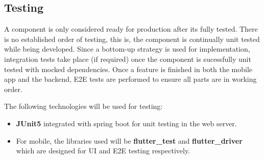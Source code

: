\subsection{Testing}
A component is only considered ready for production after its fully tested. 
There is no established order of testing, this is, the component is continually unit tested while being developed.
Since a bottom-up strategy is used for implementation, integration tests take place (if required) once the component is sucessfully unit tested with mocked dependencies.
Once a feature is finished in both the mobile app and the backend, E2E tests are performed to ensure all parts are in working order.

The following technologies will be used for testing:
\begin{itemize}
    \item 
    \textbf{JUnit5} integrated with spring boot for unit testing in the web server.
    \item 
    For mobile, the libraries used will be \textbf{flutter\_test} and \textbf{flutter\_driver} which are designed for UI and E2E testing respectively.
\end{itemize}
